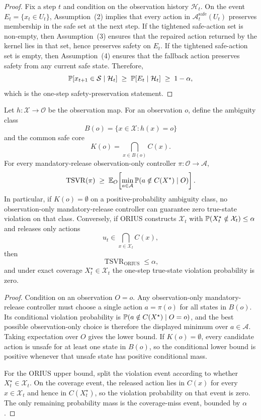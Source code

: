 \begin{proof}
Fix a step $t$ and condition on the observation history $\mathcal{H}_t$.
On the event $E_t = \{x_t \in U_t\}$, Assumption~(2) implies that every action
in $\mathcal{A}_t^{\mathrm{safe}}(U_t)$ preserves membership in the safe set
at the next step.  If the tightened safe-action set is non-empty, then
Assumption~(3) ensures that the repaired action returned by the kernel lies in
that set, hence preserves safety on $E_t$.  If the tightened safe-action set
is empty, then Assumption~(4) ensures that the fallback action preserves
safety from any current safe state.  Therefore,
\[
  \operatorname{\mathbb{P}}[x_{t+1}\in\mathcal{S} \mid \mathcal{H}_t]
  \;\ge\;
  \operatorname{\mathbb{P}}[E_t \mid \mathcal{H}_t]
  \;\ge\;
  1-\alpha,
\]
which is the one-step safety-preservation statement.
\end{proof}

\begin{corollary}
\label{cor:observation-ambiguity-sandwich}
Let $h:\mathcal{X}\to\mathcal{O}$ be the observation map.  For an observation
$o$, define the ambiguity class
\[
  B(o)=\{x\in\mathcal{X}:h(x)=o\}
\]
and the common safe core
\[
  K(o)=\bigcap_{x\in B(o)}C(x).
\]
For every mandatory-release observation-only controller
$\pi:\mathcal{O}\to\mathcal{A}$,
\[
  \operatorname{TSVR}(\pi)
  \;\ge\;
  \mathbb{E}_{O}\!\left[
    \min_{a\in\mathcal{A}}
    \operatorname{\mathbb{P}}(a\notin C(X^\star)\mid O)
  \right].
\]
In particular, if $K(o)=\emptyset$ on a positive-probability ambiguity class,
no observation-only mandatory-release controller can guarantee zero
true-state violation on that class.  Conversely, if ORIUS constructs
$\mathcal{X}_t$ with
$\operatorname{\mathbb{P}}(X_t^\star\notin\mathcal{X}_t)\le\alpha$ and releases only actions
\[
  u_t\in\bigcap_{x\in\mathcal{X}_t}C(x),
\]
then
\[
  \operatorname{TSVR}_{\mathrm{ORIUS}}\le\alpha,
\]
and under exact coverage $X_t^\star\in\mathcal{X}_t$ the one-step
true-state violation probability is zero.
\end{corollary}

\begin{proof}
Condition on an observation $O=o$.  Any observation-only mandatory-release
controller must choose a single action $a=\pi(o)$ for all states in $B(o)$.
Its conditional violation probability is
$\operatorname{\mathbb{P}}(a\notin C(X^\star)\mid O=o)$, and the best possible observation-only
choice is therefore the displayed minimum over $a\in\mathcal{A}$.  Taking
expectation over $O$ gives the lower bound.  If $K(o)=\emptyset$, every
candidate action is unsafe for at least one state in $B(o)$, so the
conditional lower bound is positive whenever that unsafe state has positive
conditional mass.

For the ORIUS upper bound, split the violation event according to whether
$X_t^\star\in\mathcal{X}_t$.  On the coverage event, the released action lies
in $C(x)$ for every $x\in\mathcal{X}_t$ and hence in $C(X_t^\star)$, so the
violation probability on that event is zero.  The only remaining probability
mass is the coverage-miss event, bounded by $\alpha$.
\end{proof}

